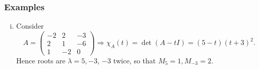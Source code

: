 \documentclass[10pt]{article}
\begin{document}
    \subsubsection{Examples}
    \begin{example}
        \begin{enumerate}[(i)]
            \item Consider 
            \[
                A=\begin{pmatrix}
                    -2 & 2 & -3 \\
                    2 & 1 & -6 \\
                    1 & -2 & 0
                \end{pmatrix}\Longrightarrow \chi_A(t)=\det (A-tI)=(5-t)(t+3)^2
            .\]
            Hence roots are $ \lambda=5,-3 $, $-3$ twice, so that $ M_5=1, M_{-3}=2 $.
            

\end{enumerate}
\end{example}
\end{document}
